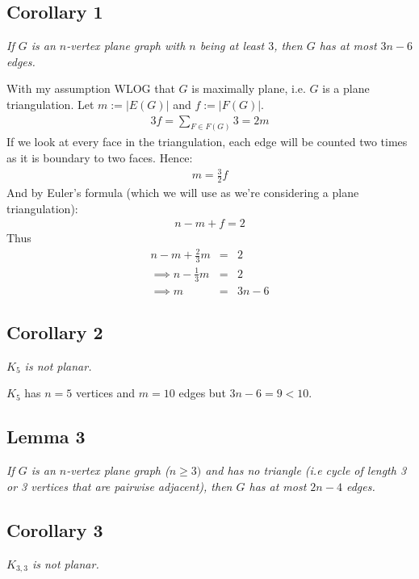 		\subsection{Corollary 1} 
		\textit{If $G$ is an $n$-vertex plane graph with $n$ being at least $3$, then $G$ has at most $3n - 6$ edges.\\}
		
		With my assumption WLOG that $G$ is maximally plane, i.e. $G$ is a plane triangulation. Let $m := |E(G)|$ and $f := |F(G)|$.
		\begin{eqnarray}
			3f = \sum_{F \in F(G)} 3 = 2m
		\end{eqnarray}
		If we look at every face in the triangulation, each edge will be counted two times as it is boundary to two faces. Hence:
		\begin{eqnarray}
			m = \frac{3}{2} f
		\end{eqnarray}
		And by Euler's formula (which we will use as we're considering a plane triangulation):
		\begin{eqnarray}
			n - m + f = 2
		\end{eqnarray}
		Thus 
		\begin{eqnarray}
			n - m + \frac{2}{3}m &=& 2 \\
			\implies n - \frac{1}{3} m &=& 2 \\
			\implies m &=& 3n - 6
		\end{eqnarray}
		
		\subsection{Corollary 2}
		\textit{$K_5$ is not planar.\\}
		
		$K_5$ has $n = 5$ vertices and $m = 10$ edges but $3n - 6 = 9 < 10$.
		
		
		\subsection{Lemma 3}
		\textit{If $G$ is an $n$-vertex plane graph ($n \geq 3)$ and has no triangle (i.e cycle of length 3 or 3 vertices that are pairwise adjacent), then $G$ has at most $2n - 4$ edges.\\}
		
		\subsection{Corollary 3}
		\textit{$K_{3,3}$ is not planar.\\}
		
